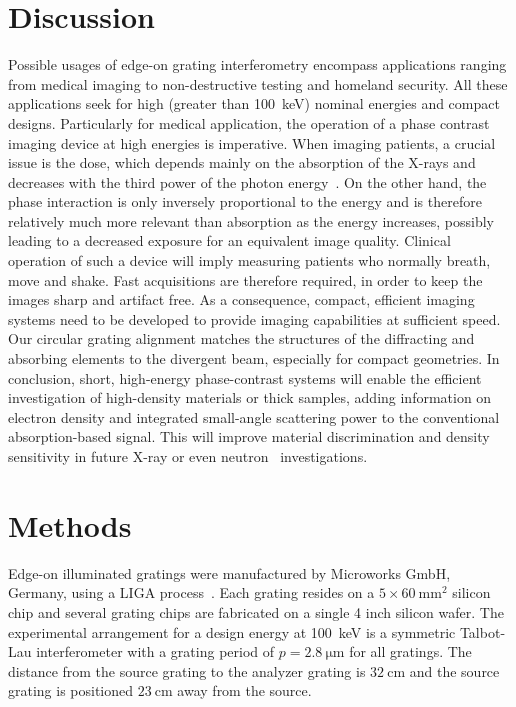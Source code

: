 \documentclass[english]{nature}
\begin{document}
\section*{Discussion}

Possible usages of edge-on grating interferometry encompass applications
ranging from medical imaging to non-destructive testing and homeland
security. All these applications seek for high (greater than
\SI{100}{\kilo\eV}) nominal energies
and compact designs. Particularly for medical application, the operation of
a phase contrast imaging device at high energies is imperative. When imaging
patients, a crucial issue is the dose, which depends mainly on the
absorption of the X-rays and decreases with the third power of the photon
energy~\cite{Momose2005}. On the other hand, the phase interaction is only inversely
proportional to the energy and is therefore relatively much more relevant
than absorption as the energy increases, possibly leading to a decreased
exposure for an equivalent image quality. Clinical operation of such a
device will imply measuring patients who normally breath, move and shake.
Fast acquisitions are therefore required, in order to keep the images sharp
and artifact free. As a consequence, compact, efficient imaging systems need
to be developed to provide imaging capabilities at sufficient speed. Our
circular grating alignment matches the structures of the diffracting and
absorbing elements to the divergent beam, especially for compact geometries.
In conclusion, short, high-energy phase-contrast systems will enable the
efficient investigation of high-density materials or thick samples, adding
information on electron density and integrated small-angle scattering power
to the conventional absorption-based signal. This will improve material
discrimination and density sensitivity in future X-ray or even
neutron~\cite{Grunzweig2008} investigations.

\section*{Methods}
Edge-on illuminated gratings were manufactured by Microworks GmbH, Germany, using a LIGA process~\cite{Kenntner2010}. Each grating
resides on a $5 \times \SI{60}{\milli\metre^2}$ silicon chip and several
grating chips are fabricated on a single 4 inch silicon wafer. The
experimental arrangement for a design energy at \SI{100}{\kilo\electronvolt}
is a symmetric Talbot-Lau interferometer with a grating period of $p =
\SI{2.8}{\micro \metre}$ for all gratings. The distance from the source
grating to the analyzer grating is $\SI{32}{\centi\metre}$ and the source
grating is positioned $\SI{23}{\centi\metre}$ away from the source.
\end{document}
